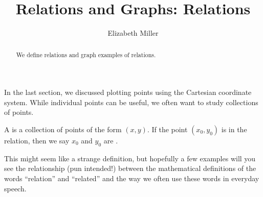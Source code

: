\documentclass[nooutcomes]{ximera}
\author{Elizabeth Miller}
\title{Relations and Graphs: Relations}
\begin{document}
\begin{abstract}
We define relations and graph examples of relations. 
\end{abstract}
\maketitle


In the last section, we discussed plotting points using the Cartesian coordinate system. While individual points can be useful, we often want to study collections of points.

\begin{definition}
A  is a collection of points of the form $(x,y)$.  If the point $(x_0,y_0)$ is in the relation, then we say $x_0$ and $y_0$ are .
\end{definition}

This might seem like a strange definition, but hopefully a few
examples will you see the relationship (pun intended!) between the
mathematical definitions of the words ``relation'' and ``related'' and the
way we often use these words in everyday speech.

\end{document}
